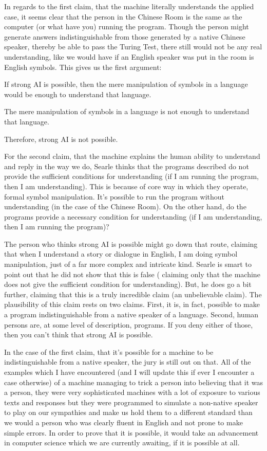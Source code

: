 In regards to the first claim, that the machine literally understands the applied case, it seems clear that the person in the Chinese Room is the same as the computer (or what have you) running the program. Though the person might generate answers indistinguishable from those generated by a native Chinese speaker, thereby be able to pass the Turing Test, there still would not be any real understanding, like we would have if an English speaker was put in the room is English symbols. This gives us the first argument:
\begin{earg}
        \item[]If strong AI is possible, then the mere manipulation of symbols in a language would be enough to understand that language.
        \item[]The mere manipulation of symbols in a language is not enough to understand that language.
        \item[]Therefore, strong AI is not possible.
\end{earg}
For the second claim, that the machine explains the human ability to understand and reply in the way we do, Searle thinks that the programs described do not provide the sufficient conditions for understanding (if I am running the program, then I am understanding). This is because of core way in which they operate, formal symbol manipulation. It's possible to run the program without understanding (in the case of the Chinese Room).  On the other hand, do the programs provide a necessary condition for understanding (if I am understanding, then I am running the program)?

The person who thinks strong AI is possible might go down that route, claiming that when I understand a story or dialogue in English, I am doing symbol manipulation, just of a far more complex and intricate kind. Searle is smart to point out that he did not show that this is false ( claiming only that the machine does not give the sufficient condition for understanding). But, he does go a bit further, claiming that this is a truly incredible claim (an unbelievable claim). The plausibility of this claim rests on two claims. First, it is, in fact, possible to make a program indistinguishable from a native speaker of a language. Second, human persons are, at some level of description, programs. If you deny either of those, then you can't think that strong AI is possible.

In the case of the first claim, that it's possible for a machine to be indistinguishable from a native speaker, the jury is still out on that. All of the examples which I have encountered (and I will update this if ever I encounter a case otherwise) of a machine managing to trick a person into believing that it was a person, they were very sophisticated machines with a lot of exposure to various texts and responses but they were programmed to simulate a non-native speaker to play on our sympathies and make us hold them to a different standard than we would a person who was clearly fluent in English and not prone to make simple errors. In order to prove that it is possible, it would take an advancement in computer science which we are currently awaiting, if it is possible at all. 

